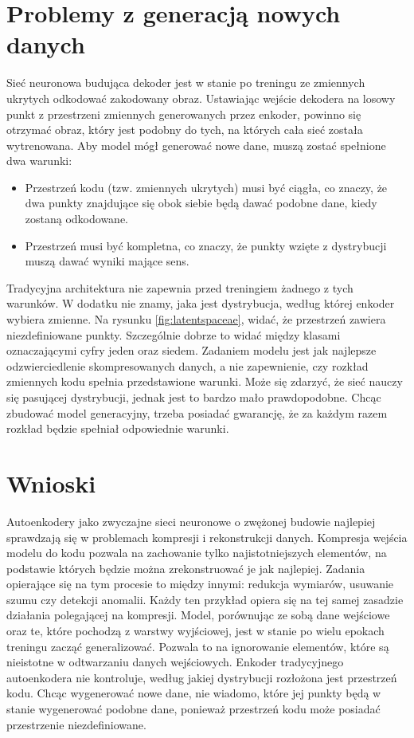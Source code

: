 \documentclass[a4paper,12pt,oneside]{book} %
\begin{document}
\section{Problemy z generacją nowych danych}
 Sieć neuronowa budująca dekoder jest w stanie po treningu ze zmiennych ukrytych odkodować zakodowany obraz. Ustawiając wejście dekodera na losowy punkt z przestrzeni zmiennych generowanych przez enkoder, powinno się otrzymać obraz, który jest podobny do tych, na których cała sieć została wytrenowana.
Aby model mógł generować nowe dane, muszą zostać spełnione dwa warunki:
\begin{itemize}
	\item Przestrzeń kodu (tzw. zmiennych ukrytych) musi być ciągła, co znaczy, że dwa punkty znajdujące się obok siebie będą dawać podobne dane, kiedy zostaną odkodowane.
	\item Przestrzeń musi być kompletna, co znaczy, że punkty wzięte z dystrybucji muszą dawać wyniki mające sens.
\end{itemize}
Tradycyjna architektura nie zapewnia przed treningiem żadnego z tych warunków. W dodatku nie znamy, jaka jest dystrybucja, według której enkoder wybiera zmienne. Na rysunku \ref{fig:latentspaceae}, widać, że przestrzeń zawiera niezdefiniowane punkty. Szczególnie dobrze to widać między klasami oznaczającymi cyfry jeden oraz siedem. Zadaniem modelu jest jak najlepsze odzwierciedlenie skompresowanych danych, a nie zapewnienie, czy rozkład zmiennych kodu spełnia przedstawione warunki. Może się zdarzyć, że sieć nauczy się pasującej dystrybucji, jednak jest to bardzo mało prawdopodobne. Chcąc zbudować model generacyjny, trzeba posiadać gwarancję, że za każdym razem rozkład będzie spełniał odpowiednie warunki.
\newpage
\section{Wnioski}
Autoenkodery jako zwyczajne sieci neuronowe o zwężonej budowie najlepiej sprawdzają się w problemach kompresji i rekonstrukcji danych. Kompresja wejścia modelu do kodu pozwala na zachowanie tylko najistotniejszych elementów, na podstawie których będzie można zrekonstruować je jak najlepiej. Zadania opierające się na tym procesie to między innymi: redukcja wymiarów, usuwanie szumu czy detekcji anomalii. Każdy ten przykład opiera się na tej samej zasadzie działania polegającej na kompresji. Model, porównując ze sobą dane wejściowe oraz te, które pochodzą z warstwy wyjściowej, jest w stanie po wielu epokach treningu zacząć generalizować. Pozwala to na ignorowanie elementów, które są nieistotne w odtwarzaniu danych wejściowych. Enkoder tradycyjnego autoenkodera nie kontroluje, według jakiej dystrybucji rozłożona jest przestrzeń kodu. Chcąc wygenerować nowe dane, nie wiadomo, które jej punkty będą w stanie wygenerować podobne dane, ponieważ przestrzeń kodu może posiadać przestrzenie niezdefiniowane.
 
\end{document}
